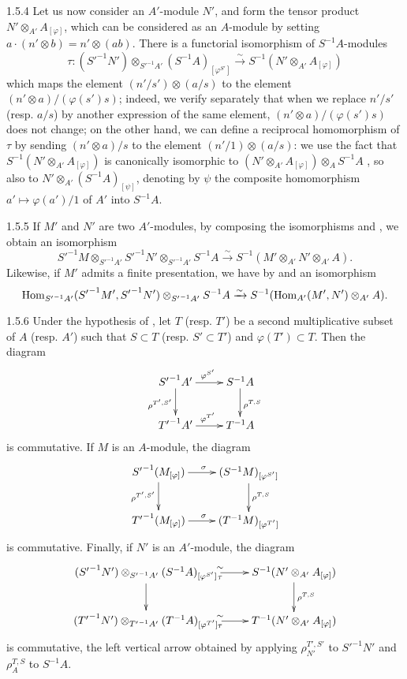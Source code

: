 \begin{env}{1.5.4}
\label{env-0.1.5.4}
Let us now consider an $A'$-module $N'$, and form the tensor product $N'\otimes_{A'}A_{[\varphi]}$,
which can be considered as an $A$-module by setting $a\cdot(n'\otimes b)=n'\otimes(ab)$. There is a
functorial isomorphism of $S^{-1}A$-modules
\[
  \tau\colon({S'}^{-1}N')\otimes_{{S'}^{-1}A'}(S^{-1}A)_{[\varphi^{S'}]}
  \xrightarrow{\sim}S^{-1}(N'\otimes_{A'}A_{[\varphi]})
\]
which maps the element $(n'/s')\otimes(a/s)$ to the element $(n'\otimes a)/(\varphi(s')s)$;
indeed, we verify separately that when we replace $n'/s'$ (resp. $a/s$) by another expression of the
same element, $(n'\otimes a)/(\varphi(s')s)$ does not change; on the other hand, we can define a
reciprocal homomorphism of $\tau$ by sending $(n'\otimes a)/s$ to the element $(n'/1)\otimes(a/s)$:
we use the fact that $S^{-1}(N'\otimes_{A'}A_{[\varphi]})$ is canonically isomorphic to
$(N'\otimes_{A'}A_{[\varphi]})\otimes_A S^{-1}A$ , so also to $N'\otimes_{A'}(S^{-1}A)_{[\psi]}$,
denoting by $\psi$ the composite homomorphism $a'\mapsto\varphi(a')/1$ of $A'$ into $S^{-1}A$.
\end{env}

\begin{env}{1.5.5}
\label{env-0.1.5.5}
If $M'$ and $N'$ are two $A'$-modules, by composing the isomorphisms  and , we obtain
an isomorphism
\[
  {S'}^{-1}M\otimes_{{S'}^{-1}A'}{S'}^{-1}N'\otimes_{{S'}^{-1}A'}S^{-1}A
  \xrightarrow{\sim}S^{-1}(M'\otimes_{A'}N'\otimes_{A'}A).
\]
Likewise, if $M'$ admits a finite presentation, we have by  and  an isomorphism
\[
  \operatorname{Hom}_{{S'}^{-1}A'}({S'}^{-1}M',{S'}^{-1}N')\otimes_{{S'}^{-1}A'}S^{-1}A
  \xrightarrow{\sim}S^{-1}(\operatorname{Hom}_{A'}(M',N')\otimes_{A'}A).
\]
\end{env}

\begin{env}{1.5.6}
\label{env-0.1.5.6}
Under the hypothesis of , let $T$ (resp. $T'$) be a second multiplicative subset of $A$
(resp. $A'$) such that $S\subset T$ (resp. $S'\subset T'$) and $\varphi(T')\subset T$. Then the diagram
\[
  \xymatrix{
    {S'}^{-1}A'\ar[r]^{\varphi^{S'}}\ar[d]_{\rho^{T',S'}} & S^{-1}A\ar[d]^{\rho^{T,S}}\\
    {T'}^{-1}A'\ar[r]^{\varphi^{T'}} & T^{-1}A
  }
\]
is commutative. If $M$ is an $A$-module, the diagram
\[
  \xymatrix{
    {S'}^{-1}(M_{[\varphi]})\ar[r]^\sigma\ar[d]_{\rho^{T',S'}} &
    (S^{-1}M)_{[\varphi^{S'}]}\ar[d]^{\rho^{T,S}}\\
    {T'}^{-1}(M_{[\varphi]})\ar[r]^\sigma & (T^{-1}M)_{[\varphi^{T'}]}
  }
\]
is commutative. Finally, if $N'$ is an $A'$-module, the diagram
\[
  \xymatrix{
    ({S'}^{-1}N')\otimes_{{S'}^{-1}A'}(S^{-1}A)_{[\varphi^{S'}]}\ar[r]^\sim_\tau\ar[d] &
    S^{-1}(N'\otimes_{A'}A_{[\varphi]})\ar[d]^{\rho^{T,S}}\\
    ({T'}^{-1}N')\otimes_{{T'}^{-1}A'}(T^{-1}A)_{[\varphi^{T'}]}
    \ar[r]^\sim_\tau & T^{-1}(N'\otimes_{A'}A_{[\varphi]})
  }
\]
is commutative, the left vertical arrow obtained by applying
$\rho_{N'}^{T',S'}$ to ${S'}^{-1}N'$ and $\rho_A^{T,S}$ to $S^{-1}A$.
\end{env}

